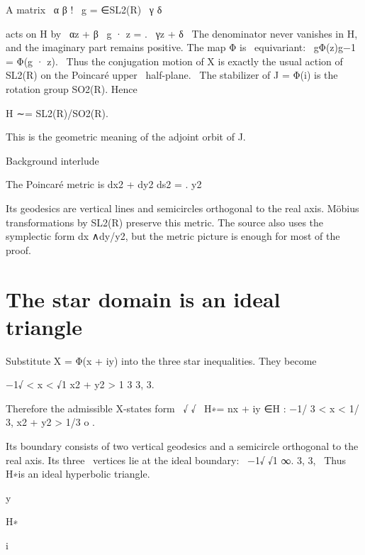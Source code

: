 \begin{displaytext}
A matrix \
α β ! \
g = ∈SL2(R) \
γ δ
\end{displaytext}

\begin{displaytext}
acts on H by \
αz + β \
g · z = . \
γz + δ \
The denominator never vanishes in H, and the imaginary part remains positive. The map Φ is \
equivariant: \
gΦ(z)g−1 = Φ(g · z). \
Thus the conjugation motion of X is exactly the usual action of SL2(R) on the Poincaré upper \
half-plane. \
The stabilizer of J = Φ(i) is the rotation group SO2(R). Hence
\end{displaytext}

H ∼= SL2(R)/SO2(R).


This is the geometric meaning of the adjoint orbit of J.


Background interlude


The Poincaré metric is dx2 + dy2 ds2 = . y2


Its geodesics are vertical lines and semicircles orthogonal to the real axis. Möbius transformations by SL2(R) preserve this metric. The source also uses the symplectic form dx ∧dy/y2, but the metric picture is enough for most of the proof.


\section{The star domain is an ideal triangle}

Substitute X = Φ(x + iy) into the three star inequalities. They become


\begin{displaytext}
−1√ < x < √1 x2 + y2 > 1 3 3, 3.
\end{displaytext}

\begin{displaytext}
Therefore the admissible X-states form \
√ √ \
H∗= nx + iy ∈H : −1/ 3 < x < 1/ 3, x2 + y2 > 1/3 o .
\end{displaytext}

\begin{displaytext}
Its boundary consists of two vertical geodesics and a semicircle orthogonal to the real axis. Its three \
vertices lie at the ideal boundary: \
−1√ √1 ∞. 3, 3, \
Thus H∗is an ideal hyperbolic triangle.
\end{displaytext}

y


H∗


i


